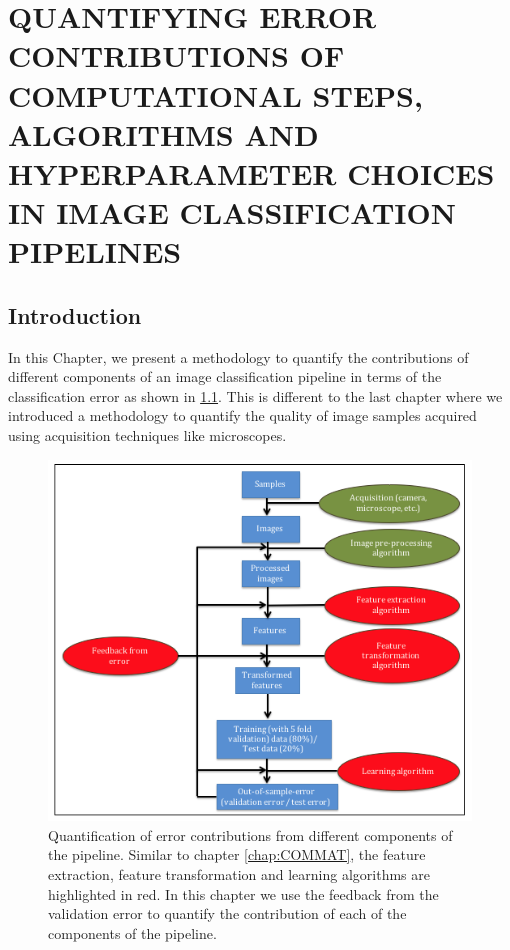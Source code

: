 \chapter{QUANTIFYING ERROR CONTRIBUTIONS OF COMPUTATIONAL STEPS, ALGORITHMS AND HYPERPARAMETER CHOICES IN IMAGE CLASSIFICATION PIPELINES}
\label{chap:EP}

\let\thefootnote\relax{}

\section{Introduction} 
\label{sec1}
In this Chapter, we present a methodology to quantify the contributions of different components of an image classification pipeline in terms of the classification error as shown in \ref{fig:chapter5}. This is different to the last chapter where we introduced a methodology to quantify the quality of image samples acquired using acquisition techniques like microscopes. 

\begin{figure}[ht!]
\centering
\includegraphics[width=1.0\textwidth]{img/chapter5}
\caption{Quantification of error contributions from different components of the pipeline. Similar to  chapter \ref{chap:COMMAT}, the feature extraction, feature transformation and learning algorithms are highlighted in red. In this chapter we use the feedback from the validation error to quantify the contribution of each of the components of the pipeline.}
\label{fig:chapter5}
\end{figure}


